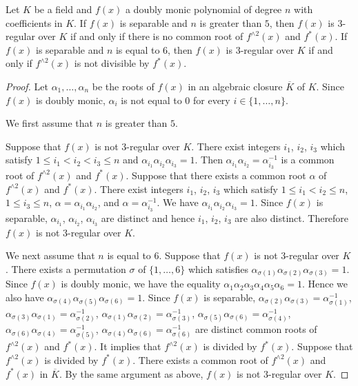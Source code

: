 \documentclass[10pt,a4paper]{amsart}
\newcommand{\cb}{}
\begin{document}
\begin{prop}\label{3-regular}
Let $K$ be a field and 
$f(x)$ a doubly monic polynomial of degree $n$ with coefficients in $K$. 
If $f(x)$ is separable and $n$ is greater than $5$, 
then $f(x)$ is $3$-regular over $K$ if and only if there is no common root of 
$f^{\wedge 2}(x)$ and $f^*(x)$. 
If $f(x)$ is separable and $n$ is equal to $6$, 
then $f(x)$ is $3$-regular over $K$ if and only if 
$f^{\wedge 2}(x)$ is not
{\cb
divisible }
by $f^*(x)$.
\end{prop}

\begin{proof}
Let $\alpha_1,\ldots,\alpha_n$ be the roots of $f(x)$ in an algebraic closure $\overline{K}$ of $K$. 
Since $f(x)$ is doubly monic, $\alpha_i$ is not equal to $0$ for every $i\in\{1,\ldots ,n\}$. 

We first assume that $n$ is greater than $5$. 

Suppose that $f(x)$ is not $3$-regular over $K$. 
There exist integers $i_1$, $i_2$, $i_3$ which satisfy $1\leq i_1<i_2<i_3\leq n$ 
and $\alpha_{i_1}\alpha_{i_2}\alpha_{i_3}=1$. 
Then $\alpha_{i_1}\alpha_{i_2}=\alpha_{i_3}^{-1}$ is a common root of $f^{\wedge 2}(x)$ and $f^*(x)$. 
Suppose that there exists a common root $\alpha$ of $f^{\wedge 2}(x)$ and $f^*(x)$. 
There exist integers $i_1$, $i_2$, $i_3$ which satisfy $1\leq i_1<i_2\leq n$, $1\leq i_3\leq n$, 
$\alpha=\alpha_{i_1}\alpha_{i_2}$, and $\alpha=\alpha_{i_3}^{-1}$. 
We have $\alpha_{i_1}\alpha_{i_2}\alpha_{i_3}=1$. 
Since $f(x)$ is separable, $\alpha_{i_1}$, $\alpha_{i_2}$, $\alpha_{i_3}$ are distinct and hence 
$i_1$, $i_2$, $i_3$ are also distinct. Therefore $f(x)$ is not $3$-regular over $K$. 

We next assume that $n$ is equal to $6$. 
Suppose that $f(x)$ is not $3$-regular over $K$. 
There exists a permutation $\sigma$ of $\{1,\ldots ,6\}$ which satisfies 
$\alpha_{\sigma(1)}\alpha_{\sigma(2)}\alpha_{\sigma(3)}=1$. 
Since $f(x)$ is doubly monic, we have the equality 
$\alpha_1\alpha_2\alpha_3\alpha_4\alpha_5\alpha_6=1$. 
Hence we also have $\alpha_{\sigma(4)}\alpha_{\sigma(5)}\alpha_{\sigma(6)}=1$. 
Since $f(x)$ is separable, $\alpha_{\sigma(2)}\alpha_{\sigma(3)}=\alpha_{\sigma(1)}^{-1}$, 
$\alpha_{\sigma(3)}\alpha_{\sigma(1)}=\alpha_{\sigma(2)}^{-1}$, 
$\alpha_{\sigma(1)}\alpha_{\sigma(2)}=\alpha_{\sigma(3)}^{-1}$, 
$\alpha_{\sigma(5)}\alpha_{\sigma(6)}=\alpha_{\sigma(4)}^{-1}$, 
$\alpha_{\sigma(6)}\alpha_{\sigma(4)}=\alpha_{\sigma(5)}^{-1}$, 
$\alpha_{\sigma(4)}\alpha_{\sigma(6)}=\alpha_{\sigma(6)}^{-1}$ are distinct common roots of 
$f^{\wedge 2}(x)$ and $f^*(x)$. It implies that $f^{\wedge 2}(x)$ is divided by $f^*(x)$. 
Suppose that $f^{\wedge 2}(x)$ is divided by $f^*(x)$. 
There exists a common root of $f^{\wedge 2}(x)$ and $f^*(x)$ in $\overline{K}$. 
By the same argument as above, $f(x)$ is not $3$-regular over $K$. 
\end{proof}
\end{document}
